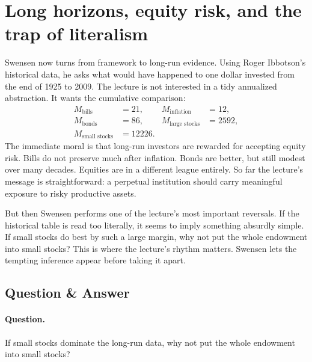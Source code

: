 \section{Long horizons, equity risk, and the trap of literalism}

Swensen now turns from framework to long-run evidence. Using Roger Ibbotson's historical data, he asks what would have happened to one dollar invested from the end of 1925 to 2009. The lecture is not interested in a tidy annualized abstraction. It wants the cumulative comparison:
\begin{align}
M_{\text{bills}} &= 21, &
M_{\text{inflation}} &= 12,\\
M_{\text{bonds}} &= 86, &
M_{\text{large stocks}} &= 2592,\\
M_{\text{small stocks}} &= 12226. &&
\end{align}
The immediate moral is that long-run investors are rewarded for accepting equity risk. Bills do not preserve much after inflation. Bonds are better, but still modest over many decades. Equities are in a different league entirely. So far the lecture's message is straightforward: a perpetual institution should carry meaningful exposure to risky productive assets.

But then Swensen performs one of the lecture's most important reversals. If the historical table is read too literally, it seems to imply something absurdly simple. If small stocks do best by such a large margin, why not put the whole endowment into small stocks? This is where the lecture's rhythm matters. Swensen lets the tempting inference appear before taking it apart.

\subsection{Question \& Answer}

\paragraph{Question.} If small stocks dominate the long-run data, why not put the whole endowment into small stocks?


